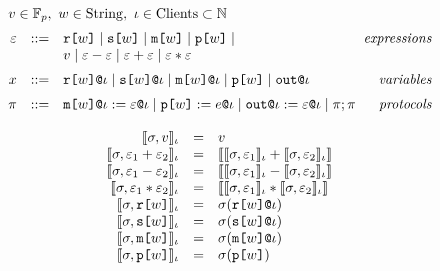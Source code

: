$$
    \begin{array}{rcl@{\hspace{2mm}}r}
      \multicolumn{4}{l}{v \in \mathbb{F}_p,\ w \in \mathrm{String},\ \cid \in \mathrm{Clients} \subset  \mathbb{N} }\\[2mm] %
      \be &::=& \flip{w} \mid \secret{w} \mid \mesg{w} \mid \rvl{w} \mid & \textit{expressions}\\
      & & v \mid \be \fminus \be \mid \be \fplus \be \mid \be \ftimes \be \\[2mm]
      x &::=& \elab{\flip{w}}{\cid} \mid \elab{\secret{w}}{\cid} \mid \elab{\mesg{w}}{\cid} \mid \rvl{w} \mid \out{\cid} & \textit{variables} \\[2mm]
      \prog &::=& \eassign{\mesg{w}}{\cid}{\be}{\cid} \mid
      \reveal{w}{e}{\cid} \mid \pubout{\cid}{\be}{\cid} \mid \prog;\prog & \textit{protocols} 
    \end{array}
$$

\bigskip
    
 $$
  \begin{array}{rcl}
    \llbracket \sigma, v \rrbracket_{\iota} &=& v\\
    \llbracket \sigma, \varepsilon_1 + \varepsilon_2 \rrbracket_{\iota} &=& \llbracket \llbracket \sigma, \varepsilon_1 \rrbracket_{\iota} + \llbracket \sigma, \varepsilon_2 \rrbracket_{\iota} \rrbracket_{}\\ 
    \llbracket \sigma, \varepsilon_1 - \varepsilon_2 \rrbracket_{\iota} &=& \llbracket \llbracket \sigma, \varepsilon_1 \rrbracket_{\iota} - \llbracket \sigma, \varepsilon_2 \rrbracket_{\iota} \rrbracket_{}\\ 
    \llbracket \sigma, \varepsilon_1 * \varepsilon_2 \rrbracket_{\iota} &=& \llbracket \llbracket \sigma, \varepsilon_1 \rrbracket_{\iota} * \llbracket \sigma, \varepsilon_2 \rrbracket_{\iota} \rrbracket_{}\\
    \llbracket \sigma, \texttt{r[}w\texttt{]} \rrbracket_{\iota} &=& \sigma(\texttt{r[}w\texttt{]}\texttt{@}\iota)\\
    \llbracket \sigma, \texttt{s[}w\texttt{]} \rrbracket_{\iota} &=& \sigma(\texttt{s[}w\texttt{]}\texttt{@}\iota)\\
    \llbracket \sigma, \texttt{m[}w\texttt{]} \rrbracket_{\iota} &=& \sigma(\texttt{m[}w\texttt{]}\texttt{@}\iota)\\
    \llbracket \sigma, \texttt{p[}w\texttt{]} \rrbracket_{\iota} &=& \sigma(\texttt{p[}w\texttt{]})\\
  \end{array}
  $$


